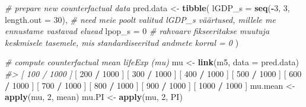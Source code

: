 \documentclass[]{book}
\newenvironment{Shaded}{\begin{snugshade}}{\end{snugshade}}
\newcommand{\KeywordTok}[1]{\textcolor[rgb]{0.13,0.29,0.53}{\textbf{#1}}}
\newcommand{\DataTypeTok}[1]{\textcolor[rgb]{0.13,0.29,0.53}{#1}}
\newcommand{\DecValTok}[1]{\textcolor[rgb]{0.00,0.00,0.81}{#1}}
\newcommand{\StringTok}[1]{\textcolor[rgb]{0.31,0.60,0.02}{#1}}
\newcommand{\CommentTok}[1]{\textcolor[rgb]{0.56,0.35,0.01}{\textit{#1}}}
\newcommand{\OperatorTok}[1]{\textcolor[rgb]{0.81,0.36,0.00}{\textbf{#1}}}
\newcommand{\NormalTok}[1]{#1}
\begin{document}
\begin{Shaded}
\begin{Highlighting}[]
\CommentTok{# prepare new counterfactual data}
\NormalTok{pred.data <-}\StringTok{ }\KeywordTok{tibble}\NormalTok{(}
    \DataTypeTok{lGDP_s =} \KeywordTok{seq}\NormalTok{(}\OperatorTok{-}\DecValTok{3}\NormalTok{, }\DecValTok{3}\NormalTok{, }\DataTypeTok{length.out =} \DecValTok{30}\NormalTok{), }\CommentTok{# need meie poolt valitud lGDP_s väärtused, millele me ennustame vastavad eluead }
    \DataTypeTok{lpop_s =} \DecValTok{0} \CommentTok{# rahvaarv fikseeritakse muutuja keskmisele tasemele, mis standardiseeritud andmete korral = 0}
\NormalTok{)}

\CommentTok{# compute counterfactual mean lifeExp (mu)}
\NormalTok{mu <-}\StringTok{ }\KeywordTok{link}\NormalTok{(m5, }\DataTypeTok{data =}\NormalTok{ pred.data)}
\CommentTok{#> [ 100 / 1000 ]}
\NormalTok{[ }\DecValTok{200} \OperatorTok{/}\StringTok{ }\DecValTok{1000}\NormalTok{ ]}
\NormalTok{[ }\DecValTok{300} \OperatorTok{/}\StringTok{ }\DecValTok{1000}\NormalTok{ ]}
\NormalTok{[ }\DecValTok{400} \OperatorTok{/}\StringTok{ }\DecValTok{1000}\NormalTok{ ]}
\NormalTok{[ }\DecValTok{500} \OperatorTok{/}\StringTok{ }\DecValTok{1000}\NormalTok{ ]}
\NormalTok{[ }\DecValTok{600} \OperatorTok{/}\StringTok{ }\DecValTok{1000}\NormalTok{ ]}
\NormalTok{[ }\DecValTok{700} \OperatorTok{/}\StringTok{ }\DecValTok{1000}\NormalTok{ ]}
\NormalTok{[ }\DecValTok{800} \OperatorTok{/}\StringTok{ }\DecValTok{1000}\NormalTok{ ]}
\NormalTok{[ }\DecValTok{900} \OperatorTok{/}\StringTok{ }\DecValTok{1000}\NormalTok{ ]}
\NormalTok{[ }\DecValTok{1000} \OperatorTok{/}\StringTok{ }\DecValTok{1000}\NormalTok{ ]}
\NormalTok{mu.mean <-}\StringTok{ }\KeywordTok{apply}\NormalTok{(mu, }\DecValTok{2}\NormalTok{, mean)}
\NormalTok{mu.PI <-}\StringTok{ }\KeywordTok{apply}\NormalTok{(mu, }\DecValTok{2}\NormalTok{, PI)}


\end{Highlighting}
\end{Shaded}
\end{document}
